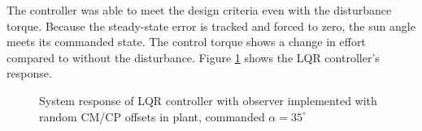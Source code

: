 \documentclass[]{aiaa-tc}%
\begin{document}
	The controller was able to meet the design criteria even with the disturbance torque. Because the steady-state error is tracked and forced to zero, the sun angle meets its commanded state. The control torque shows a change in effort compared to without the disturbance. Figure \ref{fig:LQR_MC} shows the LQR controller's response.

	\begin{figure}[H]
		\centering
		\caption{System response of LQR controller with observer implemented with random CM/CP offsets in plant, commanded $\alpha=35^{\circ}$ }
		\label{fig:LQR_MC}
	\end{figure}	
\end{document}
